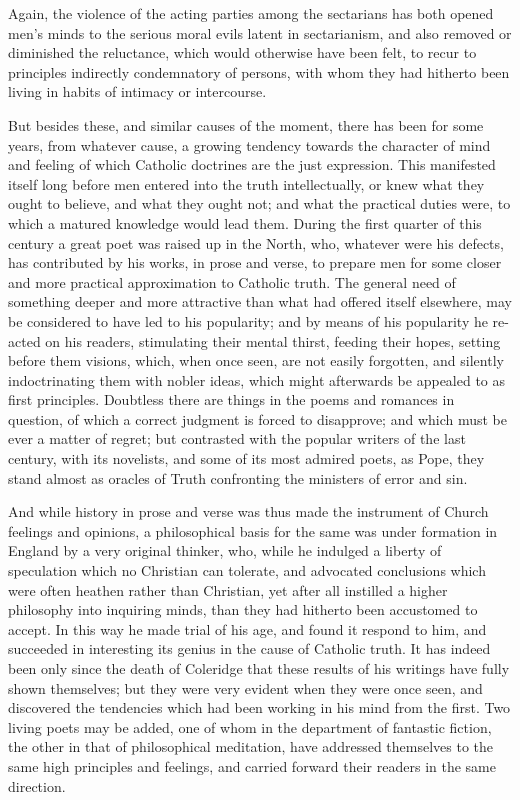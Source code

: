 Again, the violence of the acting parties among
the sectarians has both opened men's minds to the serious moral
evils latent in sectarianism, and also removed or diminished the
reluctance, which would otherwise have been felt, to recur to
principles indirectly condemnatory of persons, with whom they had
hitherto been living in habits of intimacy or intercourse.

But besides these, and similar causes of the
moment, there has been for some years, from whatever cause, a growing
tendency towards the character of mind and feeling of which Catholic
doctrines are the just expression. This manifested itself long before
men entered into the truth intellectually, or knew what they ought to
believe, and what they ought not; and what the practical duties were,
to which a matured knowledge would lead them. During the first quarter
of this century a great poet was raised up in the North, who, whatever
were his defects, has contributed by his works, in prose and verse, to
prepare men for some closer and more practical approximation to
Catholic truth. The general need of something deeper and more
attractive than what had offered itself elsewhere, may be considered
to have led to his popularity; and by means of his popularity he
re-acted on his readers, stimulating their mental thirst, feeding
their hopes, setting before them visions, which, when once seen, are
not easily forgotten, and silently indoctrinating them with nobler
ideas, which might afterwards be appealed to as first principles.
Doubtless there are things in the poems and romances in question, of
which a correct judgment is forced to disapprove; and which must be
ever a matter of regret; but contrasted with the popular writers of
the last century, with its novelists, and some of its most admired
poets, as Pope, they stand almost as oracles of Truth confronting the
ministers of error and sin.

And while history in prose and verse was thus
made the instrument of Church feelings and opinions, a
philosophical basis for the same was under formation in England by a
very original thinker, who, while he indulged a liberty of speculation
which no Christian can tolerate, and advocated conclusions which were
often heathen rather than Christian, yet after all instilled a higher
philosophy into inquiring minds, than they had hitherto been
accustomed to accept. In this way he made trial of his age, and found
it respond to him, and succeeded in interesting its genius in the
cause of Catholic truth. It has indeed been only since the death of
Coleridge that these results of his writings have fully shown
themselves; but they were very evident when they were once seen, and
discovered the tendencies which had been working in his mind from the
first. Two living poets may be added, one of whom in the department of
fantastic fiction, the other in that of philosophical meditation, have
addressed themselves to the same high principles and feelings, and
carried forward their readers in the same direction.

